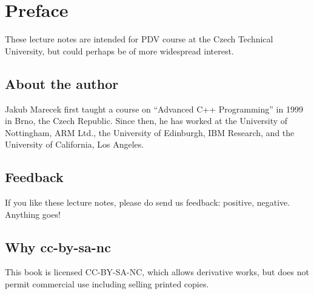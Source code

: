 \chapter{Preface}

These lecture notes are intended for PDV course at the Czech Technical University, but could perhaps be of more widespread interest. 

\section*{About the author}

Jakub Marecek first taught a course on ``Advanced C++ Programming'' in 1999 in Brno, the Czech Republic. Since then, he has worked at the University of Nottingham, ARM Ltd., the University of Edinburgh, IBM Research, and the University of California, Los Angeles.

\section*{Feedback}

If you like these lecture notes, please do send us feedback: positive, negative. Anything goes!

\section*{Why cc-by-sa-nc}

This book is licensed CC-BY-SA-NC, which allows derivative works, but does not permit commercial use including selling printed copies. 